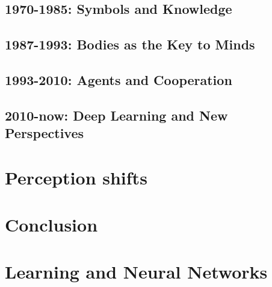 \documentclass[oneside,notitlepage]{report}
\begin{document}
\section{1970-1985: Symbols and Knowledge}


\section{1987-1993: Bodies as the Key to Minds}


\section{1993-2010: Agents and Cooperation}


\section{2010-now: Deep Learning and New Perspectives}


\chapter{Perception shifts}




\chapter{Conclusion}


\appendix
\chapter{Learning and Neural Networks}


\printbibliography
\end{document}
